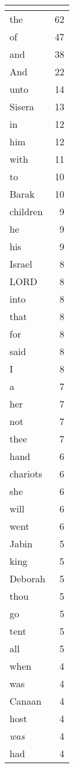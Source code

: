 \begin{center}
\begin{longtable}{l|r}
\hline \multicolumn{2}{c}{{ }} \\ \hline
\endfoot 
the & 62\\ \hline 
of & 47\\ \hline 
and & 38\\ \hline 
And & 22\\ \hline 
unto & 14\\ \hline 
Sisera & 13\\ \hline 
in & 12\\ \hline 
him & 12\\ \hline 
with & 11\\ \hline 
to & 10\\ \hline 
Barak & 10\\ \hline 
children & 9\\ \hline 
he & 9\\ \hline 
his & 9\\ \hline 
Israel & 8\\ \hline 
LORD & 8\\ \hline 
into & 8\\ \hline 
that & 8\\ \hline 
for & 8\\ \hline 
said & 8\\ \hline 
I & 8\\ \hline 
a & 7\\ \hline 
her & 7\\ \hline 
not & 7\\ \hline 
thee & 7\\ \hline 
hand & 6\\ \hline 
chariots & 6\\ \hline 
she & 6\\ \hline 
will & 6\\ \hline 
went & 6\\ \hline 
Jabin & 5\\ \hline 
king & 5\\ \hline 
Deborah & 5\\ \hline 
thou & 5\\ \hline 
go & 5\\ \hline 
tent & 5\\ \hline 
all & 5\\ \hline 
when & 4\\ \hline 
was & 4\\ \hline 
Canaan & 4\\ \hline 
host & 4\\ \hline 
\emph{was} & 4\\ \hline 
had & 4\\ \hline 

\end{longtable}
\end{center}
